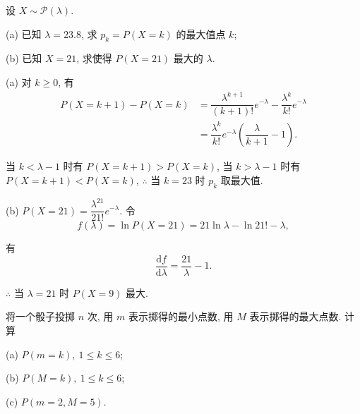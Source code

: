 \documentclass{ctexart}
\begin{document}
\begin{exercise}%
    设 $X\sim\mathcal{P}(\lambda)$.

    (a) 已知 $\lambda=23.8$, 求 $p_k=P(X=k)$ 的最大值点 $k$;

    (b) 已知 $X=21$, 求使得 $P(X=21)$ 最大的 $\lambda$.
\end{exercise}
\begin{solution}
    (a) 对 $k\geq0$, 有
    \begin{align*}
        P(X=k+1)-P(X=k) & =\dfrac{\lambda^{k+1}}{(k+1)!}e^{-\lambda}-\dfrac{\lambda^k}{k!}e^{-\lambda} \\
        & =\dfrac{\lambda^k}{k!}e^{-\lambda}\left(\dfrac{\lambda}{k+1}-1\right).
    \end{align*}

    当 $k<\lambda-1$ 时有 $P(X=k+1)>P(X=k)$, 当 $k>\lambda-1$ 时有 $P(X=k+1)<P(X=k)$, $\therefore$ 当 $k=23$ 时 $p_k$ 取最大值.

    (b) $P(X=21)=\dfrac{\lambda^{21}}{21!}e^{-\lambda}$. 令
    \[f(\lambda)=\ln P(X=21)=21\ln\lambda-\ln21!-\lambda,\]

    有
    \[\dfrac{\mathrm{d}f}{\mathrm{d}\lambda}=\dfrac{21}{\lambda}-1.\]

    $\therefore$ 当 $\lambda=21$ 时 $P(X=9)$ 最大.
\end{solution}
\begin{exercise}%
    将一个骰子投掷 $n$ 次, 用 $m$ 表示掷得的最小点数, 用 $M$ 表示掷得的最大点数. 计算

    (a) $P(m=k),\ 1\leq k\leq6$;

    (b) $P(M=k),\ 1\leq k\leq6$;

    (c) $P(m=2,M=5)$.
\end{exercise}
\end{document}

